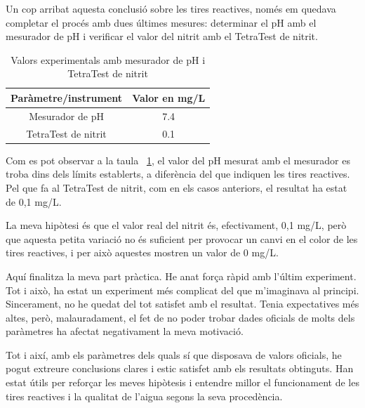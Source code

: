 Un cop arribat aquesta conclusió sobre les tires reactives, només em quedava completar el procés amb dues últimes mesures: determinar el pH amb el mesurador de pH i verificar el valor del nitrit amb el TetraTest de nitrit.
\begin{table}[H]
\centering
\begin{tabular}{|c|c|}
\hline
Paràmetre/instrument & Valor en mg/L \\
\hline
Mesurador de pH    & 7.4  \\
\hline
TetraTest de nitrit    & 0.1  \\
\hline
\end{tabular}%
\caption{Valors experimentals amb mesurador de pH i TetraTest de nitrit}
\label{tab:valors_tetra_pH}
\end{table}

Com es pot observar a la taula~ \ref{tab:valors_tetra_pH}, el valor del pH mesurat amb el mesurador es troba dins dels límits establerts, a diferència del que indiquen les tires reactives. Pel que fa al TetraTest de nitrit, com en els casos anteriors, el resultat ha estat de 0,1 mg/L.

La meva hipòtesi és que el valor real del nitrit és, efectivament, 0,1 mg/L, però que aquesta petita variació no és suficient per provocar un canvi en el color de les tires reactives, i per això aquestes mostren un valor de 0 mg/L.

Aquí finalitza la meva part pràctica. He anat força ràpid amb l’últim experiment. Tot i això, ha estat un experiment més complicat del que m’imaginava al principi. Sincerament, no he quedat del tot satisfet amb el resultat. Tenia expectatives més altes, però, malauradament, el fet de no poder trobar dades oficials de molts dels paràmetres ha afectat negativament la meva motivació.

Tot i així, amb els paràmetres dels quals sí que disposava de valors oficials, he pogut extreure conclusions clares i estic satisfet amb els resultats obtinguts. Han estat útils per reforçar les meves hipòtesis i entendre millor el funcionament de les tires reactives i la qualitat de l’aigua segons la seva procedència.
